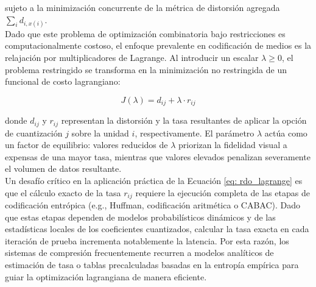             sujeto a la minimización concurrente de la métrica de distorsión agregada $\sum_{i} d_{i, x(i)}$.\\

            Dado que este problema de optimización combinatoria bajo restricciones es computacionalmente costoso, el enfoque prevalente en codificación de medios es la relajación por multiplicadores de Lagrange. Al introducir un escalar $\lambda \geq 0$, el problema restringido se transforma en la minimización no restringida de un funcional de costo lagrangiano:

            \begin{equation}\label{eq: rdo_lagrange}
                J(\lambda) = d_{ij} + \lambda \cdot r_{ij}
            \end{equation}

            donde $d_{ij}$ y $r_{ij}$ representan la distorsión y la tasa resultantes de aplicar la opción de cuantización $j$ sobre la unidad $i$, respectivamente. El parámetro $\lambda$ actúa como un factor de equilibrio: valores reducidos de $\lambda$ priorizan la fidelidad visual a expensas de una mayor tasa, mientras que valores elevados penalizan severamente el volumen de datos resultante. \\

            Un desafío crítico en la aplicación práctica de la Ecuación \eqref{eq: rdo_lagrange} es que el cálculo exacto de la tasa $r_{ij}$ requiere la ejecución completa de las etapas de codificación entrópica (e.g., Huffman, codificación aritmética o CABAC). Dado que estas etapas dependen de modelos probabilísticos dinámicos y de las estadísticas locales de los coeficientes cuantizados, calcular la tasa exacta en cada iteración de prueba incrementa notablemente la latencia. Por esta razón, los sistemas de compresión frecuentemente recurren a modelos analíticos de estimación de tasa o tablas precalculadas basadas en la entropía empírica para guiar la optimización lagrangiana de manera eficiente.


